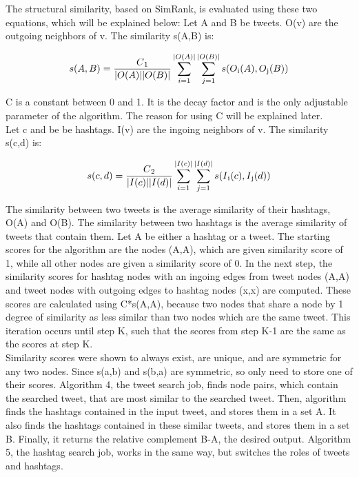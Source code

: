 \documentclass[10pt]{article}
\begin{document}
\begin{itemize}
\begin{itemize}
The structural similarity, based on SimRank, is evaluated using these two equations, which will be explained below:
Let A and B be tweets. O(v) are the outgoing neighbors of v. The similarity s(A,B) is:

$$s(A,B) = \dfrac{C\textsubscript{1}}{|O(A)||O(B)|} \sum_{i=1}^{|O(A)|} \sum_{j=1}^{|O(B)|} s(O\textsubscript{i}(A),O\textsubscript{j}(B))$$

C is a constant between 0 and 1. It is the decay factor and is the only adjustable parameter of the algorithm. The reason for using C will be explained later. \\

Let c and be be hashtags. I(v) are the ingoing neighbors of v.  The similarity s(c,d) is:

$$s(c,d) = \dfrac{C\textsubscript{2}}{|I(c)||I(d)|} \sum_{i=1}^{|I(c)|} \sum_{j=1}^{|I(d)|} s(I\textsubscript{i}(c),I\textsubscript{j}(d))$$

The similarity between two tweets is the average similarity of their hashtags, O(A) and O(B). The similarity between two hashtags is the average similarity of tweets that contain them. Let A be either a hashtag or a tweet. The starting scores for the algorithm are the nodes (A,A), which are given similarity score of 1, while all other nodes are given a similarity score of 0. In the next step, the similarity scores for hashtag nodes with an ingoing edges from tweet nodes (A,A) and tweet nodes with outgoing edges to hashtag nodes (x,x) are computed. These scores are calculated using C*s(A,A), because two nodes that share a node by 1 degree of similarity as less similar than two nodes which are the same tweet. This iteration occurs until step K, such that the scores from step K-1 are the same as the scores at step K. \\

Similarity scores were shown to always exist, are unique, and are symmetric for any two nodes. Since s(a,b) and s(b,a) are symmetric, so only need to store one of their scores. Algorithm 4, the tweet search job, finds node pairs, which contain the searched tweet, that are most similar to the searched tweet. Then, algorithm finds the hashtags contained in the input tweet, and stores them in a set A. It also finds the hashtags contained in these similar tweets, and stores them in a set B. Finally, it returns the relative complement B-A, the desired output. Algorithm 5, the hashtag search job, works in the same way, but switches the roles of tweets and hashtags. \\


\end{itemize}
\end{itemize}
\end{document}
